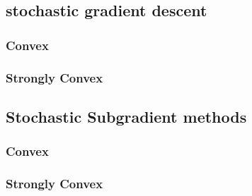 \subsection{stochastic gradient descent}
\subsubsection{Convex}


\subsubsection{Strongly Convex}


\subsection{Stochastic Subgradient methods}

\subsubsection{Convex}


\subsubsection{Strongly Convex}








